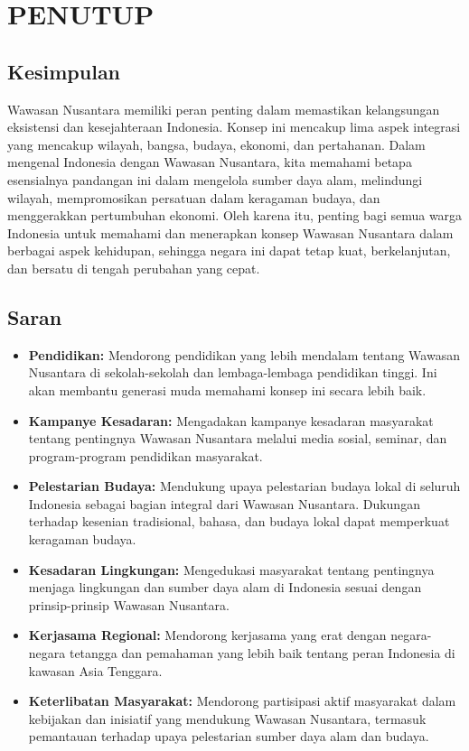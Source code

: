 \chapter{PENUTUP}

\section{Kesimpulan}
Wawasan Nusantara memiliki peran penting dalam memastikan kelangsungan eksistensi dan kesejahteraan Indonesia. Konsep ini mencakup lima aspek integrasi yang mencakup wilayah, bangsa, budaya, ekonomi, dan pertahanan. Dalam mengenal Indonesia dengan Wawasan Nusantara, kita memahami betapa esensialnya pandangan ini dalam mengelola sumber daya alam, melindungi wilayah, mempromosikan persatuan dalam keragaman budaya, dan menggerakkan pertumbuhan ekonomi. Oleh karena itu, penting bagi semua warga Indonesia untuk memahami dan menerapkan konsep Wawasan Nusantara dalam berbagai aspek kehidupan, sehingga negara ini dapat tetap kuat, berkelanjutan, dan bersatu di tengah perubahan yang cepat.

\section{Saran}
\begin{itemize}
  \item \textbf{Pendidikan:} Mendorong pendidikan yang lebih mendalam tentang Wawasan Nusantara di sekolah-sekolah dan lembaga-lembaga pendidikan tinggi. Ini akan membantu generasi muda memahami konsep ini secara lebih baik.
  
  \item \textbf{Kampanye Kesadaran:} Mengadakan kampanye kesadaran masyarakat tentang pentingnya Wawasan Nusantara melalui media sosial, seminar, dan program-program pendidikan masyarakat.
  
  \item \textbf{Pelestarian Budaya:} Mendukung upaya pelestarian budaya lokal di seluruh Indonesia sebagai bagian integral dari Wawasan Nusantara. Dukungan terhadap kesenian tradisional, bahasa, dan budaya lokal dapat memperkuat keragaman budaya.
  
  \item \textbf{Kesadaran Lingkungan:} Mengedukasi masyarakat tentang pentingnya menjaga lingkungan dan sumber daya alam di Indonesia sesuai dengan prinsip-prinsip Wawasan Nusantara.
  
  \item \textbf{Kerjasama Regional:} Mendorong kerjasama yang erat dengan negara-negara tetangga dan pemahaman yang lebih baik tentang peran Indonesia di kawasan Asia Tenggara.
  
  \item \textbf{Keterlibatan Masyarakat:} Mendorong partisipasi aktif masyarakat dalam kebijakan dan inisiatif yang mendukung Wawasan Nusantara, termasuk pemantauan terhadap upaya pelestarian sumber daya alam dan budaya.
\end{itemize}
